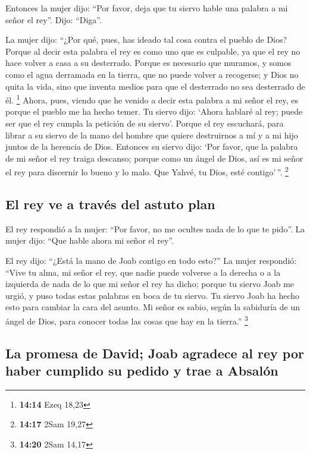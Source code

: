 \begin{paracol}{2}
 Entonces la mujer dijo: ``Por favor, deja que tu siervo
hable una palabra a mi señor el rey''. Dijo: ``Diga''.

 La mujer dijo: ``¿Por qué, pues, has ideado tal cosa
contra el pueblo de Dios? Porque al decir esta palabra el rey es como
uno que es culpable, ya que el rey no hace volver a casa a su
desterrado.  Porque es necesario que muramos, y somos
como el agua derramada en la tierra, que no puede volver a recogerse; y
Dios no quita la vida, sino que inventa medios para que el desterrado no
sea desterrado de él. \footnote{\textbf{14:14} Ezeq 18,23}
 Ahora, pues, viendo que he venido a decir esta palabra a
mi señor el rey, es porque el pueblo me ha hecho temer. Tu siervo dijo:
`Ahora hablaré al rey; puede ser que el rey cumpla la petición de su
siervo'.  Porque el rey escuchará, para librar a su
siervo de la mano del hombre que quiere destruirnos a mí y a mi hijo
juntos de la herencia de Dios.  Entonces su siervo dijo:
`Por favor, que la palabra de mi señor el rey traiga descanso; porque
como un ángel de Dios, así es mi señor el rey para discernir lo bueno y
lo malo. Que Yahvé, tu Dios, esté contigo'\,''. \footnote{\textbf{14:17}
  2Sam 19,27}

\hypertarget{el-rey-ve-a-travuxe9s-del-astuto-plan}{%
\subsection{El rey ve a través del astuto
plan}\label{el-rey-ve-a-travuxe9s-del-astuto-plan}}

 El rey respondió a la mujer: ``Por favor, no me ocultes
nada de lo que te pido''. La mujer dijo: ``Que hable ahora mi señor el
rey''.

 El rey dijo: ``¿Está la mano de Joab contigo en todo
esto?'' La mujer respondió: ``Vive tu alma, mi señor el rey, que nadie
puede volverse a la derecha o a la izquierda de nada de lo que mi señor
el rey ha dicho; porque tu siervo Joab me urgió, y puso todas estas
palabras en boca de tu siervo.  Tu siervo Joab ha hecho
esto para cambiar la cara del asunto. Mi señor es sabio, según la
sabiduría de un ángel de Dios, para conocer todas las cosas que hay en
la tierra.'' \footnote{\textbf{14:20} 2Sam 14,17}

\hypertarget{la-promesa-de-david-joab-agradece-al-rey-por-haber-cumplido-su-pedido-y-trae-a-absaluxf3n}{%
\subsection{La promesa de David; Joab agradece al rey por haber cumplido
su pedido y trae a
Absalón}\label{la-promesa-de-david-joab-agradece-al-rey-por-haber-cumplido-su-pedido-y-trae-a-absaluxf3n}}


\end{paracol}
